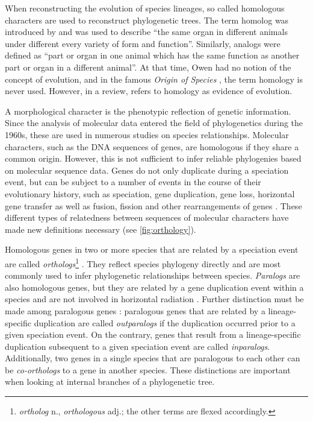 When reconstructing the evolution of species lineages, so called homologous
characters are used to reconstruct phylogenetic trees. The term homolog was
introduced by \citet{owen1848} and was used to describe ``the same organ in
different animals under different every variety of form and function''.
Similarly, analogs were defined as ``part or organ in one animal which has the
same function as another part or organ in a different animal''. At that time,
Owen had no notion of the concept of evolution, and in the famous \emph{Origin
of Species} \citep{darwin1859}, the term homology is never used. However, in a
review, \citet{owen1860} refers to homology as evidence of evolution.

A morphological character is the phenotypic reflection of genetic information.
Since the analysis of molecular data entered the field of phylogenetics during
the 1960s, these are used in numerous studies on species relationships.
Molecular characters, such as the DNA sequences of genes, are homologous if they
share a common origin. However, this is not sufficient to infer reliable
phylogenies based on molecular sequence data. Genes do not only duplicate during
a speciation event, but can be subject to a number of events in the course of
their evolutionary history, such as speciation, gene duplication, gene loss,
horizontal gene transfer as well as fusion, fission and other rearrangements of
genes \citep{koonin2005}.  These different types of relatedness between
sequences of molecular characters have made new definitions necessary (see
\autoref{fig:orthology}).



Homologous genes in two or more species that are related by a speciation event
are called \emph{orthologs}\footnote{\emph{ortholog} n., \emph{orthologous}
adj.; the other terms are flexed accordingly.} \citep{fitch1970}. They reflect
species phylogeny directly and are most commonly used to infer phylogenetic
relationships between species. \emph{Paralogs} are also homologous genes, but
they are related by a gene duplication event within a species and are not
involved in horizontal radiation \citep{ohno1970}. Further distinction must be
made among paralogous genes \citep{remm2001}: paralogous genes that are related
by a lineage-specific duplication are called \emph{outparalogs} if the
duplication occurred prior to a given speciation event. On the contrary, genes
that result from a lineage-specific duplication subsequent to a given speciation
event are called \emph{inparalogs}. Additionally, two genes in a single species
that are paralogous to each other can be \emph{co-orthologs} to a gene in
another species. These distinctions are important when looking at internal
branches of a phylogenetic tree. 

